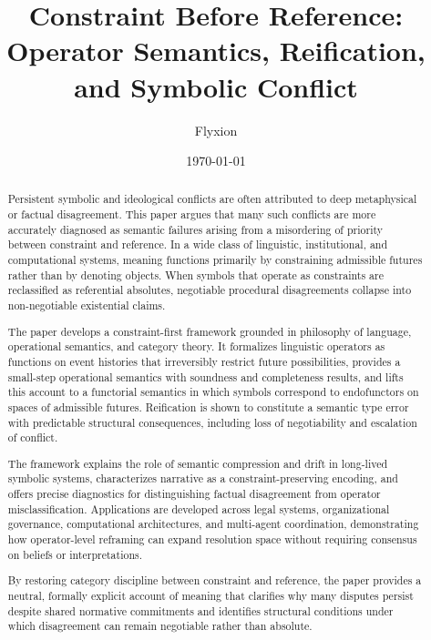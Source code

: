 \documentclass[11pt]{article}
\title{Constraint Before Reference:\\
Operator Semantics, Reification, and Symbolic Conflict}
\author{Flyxion}
\date{\today}
\begin{document}
\maketitle

\begin{abstract}
Persistent symbolic and ideological conflicts are often attributed to deep
metaphysical or factual disagreement. This paper argues that many such conflicts
are more accurately diagnosed as semantic failures arising from a misordering of
priority between constraint and reference. In a wide class of linguistic,
institutional, and computational systems, meaning functions primarily by
constraining admissible futures rather than by denoting objects. When symbols
that operate as constraints are reclassified as referential absolutes, negotiable
procedural disagreements collapse into non-negotiable existential claims.

The paper develops a constraint-first framework grounded in philosophy of
language, operational semantics, and category theory. It formalizes linguistic
operators as functions on event histories that irreversibly restrict future
possibilities, provides a small-step operational semantics with soundness and
completeness results, and lifts this account to a functorial semantics in which
symbols correspond to endofunctors on spaces of admissible futures. Reification
is shown to constitute a semantic type error with predictable structural
consequences, including loss of negotiability and escalation of conflict.

The framework explains the role of semantic compression and drift in long-lived
symbolic systems, characterizes narrative as a constraint-preserving encoding,
and offers precise diagnostics for distinguishing factual disagreement from
operator misclassification. Applications are developed across legal systems,
organizational governance, computational architectures, and multi-agent
coordination, demonstrating how operator-level reframing can expand resolution
space without requiring consensus on beliefs or interpretations.

By restoring category discipline between constraint and reference, the paper
provides a neutral, formally explicit account of meaning that clarifies why many
disputes persist despite shared normative commitments and identifies structural
conditions under which disagreement can remain negotiable rather than absolute.
\end{abstract}


\end{document}
